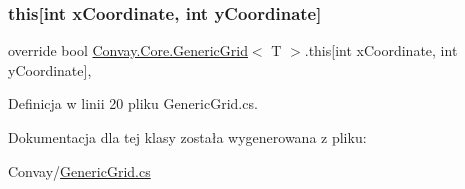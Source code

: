 \subsubsection{\texorpdfstring{this[int x\+Coordinate, int y\+Coordinate]}{this[int xCoordinate, int yCoordinate]}}
{\footnotesize\ttfamily override bool \hyperlink{class_convay_1_1_core_1_1_generic_grid}{Convay.\+Core.\+Generic\+Grid}$<$ T $>$.this\mbox{[}int x\+Coordinate, int y\+Coordinate\mbox{]}\hspace{0.3cm}{\ttfamily [get]}, {\ttfamily [set]}}



Definicja w linii 20 pliku Generic\+Grid.\+cs.



Dokumentacja dla tej klasy została wygenerowana z pliku\+:\begin{DoxyCompactItemize}
\item 
Convay/\hyperlink{_generic_grid_8cs}{Generic\+Grid.\+cs}\end{DoxyCompactItemize}

